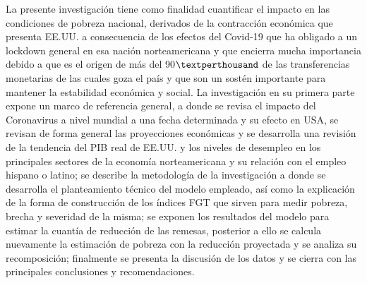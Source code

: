La presente investigación tiene como finalidad cuantificar el impacto en las condiciones de pobreza nacional, derivados de la contracción económica que presenta EE.UU. a consecuencia de los efectos del Covid-19 que ha obligado a un lockdown general en esa nación norteamericana y que encierra mucha importancia debido a que es el origen de más del 90$\textperthousand$ de las transferencias monetarias de las cuales goza el país y que son un sostén importante para mantener la estabilidad económica y social. La investigación en su primera parte expone un marco de referencia general, a donde se revisa el impacto del Coronavirus a nivel mundial a una fecha determinada y su efecto en USA, se revisan de forma general las proyecciones económicas y se desarrolla una revisión de la tendencia del PIB real de EE.UU. y los niveles de desempleo en los principales sectores de la economía norteamericana y su relación con el empleo hispano o latino; se describe la metodología de la investigación a donde se desarrolla el planteamiento técnico del modelo empleado, así como la explicación de la forma de construcción de los índices FGT que sirven para medir pobreza, brecha y severidad de la misma; se exponen los resultados del modelo para estimar la cuantía de reducción de las remesas, posterior a ello se calcula nuevamente la estimación de pobreza con la reducción proyectada y se analiza su recomposición; finalmente se presenta la discusión de los datos y se cierra con las principales conclusiones y recomendaciones.



